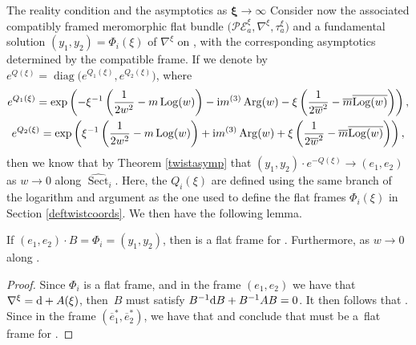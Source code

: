 \begin{subsubsection}{The reality condition and the asymptotics as $\boldsymbol{\xi \to \infty}$}
Consider now the associated compatibly framed meromorphic flat bundle $\bigl(\mathcal{PE}_a^{\xi},\nabla^{\xi},\tau_a^{\xi}\bigr)$ and a fundamental solution $(y_1,y_2)=\Phi_i(\xi)$ of $\nabla^{\xi}$ on , with the corresponding asymptotics determined by the compatible frame. If we denote by $e^{Q(\xi)}=\operatorname{diag}\bigl(e^{Q_1(\xi)},e^{Q_2(\xi)}\bigr)$, where
\begin{gather*}
 e^{Q_1(\xi)}=\exp \left(-\xi^{-1}\left(\frac{1}{2w^2}-m\operatorname{Log}(w)\right)-{\rm i}m^{(3)}\operatorname{Arg}(w)
 -\xi\left(\frac{1}{2\overline{w}^2}-\overline{m}\overline{\operatorname{Log}(w)}\right)\right),\\
 e^{Q_2(\xi)}=\exp \left(\xi^{-1}\left(\frac{1}{2w^2}-m\operatorname{Log}(w)\right)+{\rm i}m^{(3)}\operatorname{Arg}(w)
 +\xi\left(\frac{1}{2\overline{w}^2}-\overline{m}\overline{\operatorname{Log}(w)}\right)\right),
\end{gather*}
then we know that by Theorem \ref{twistasymp} that $(y_1,y_2)\cdot e^{-Q(\xi)} \to (e_1,e_2)$ as $w\to 0$ along $\widehat{\operatorname{Sect}}_i$. Here, the $Q_i(\xi)$ are defined using the same branch of the logarithm and argument as the one used to define the flat frames $\Phi_i(\xi)$ in Section \ref{deftwistcoords}. We then have the following lemma.

\begin{Lemma}\label{dual asympotics}
If $(e_1,e_2)\cdot B=\Phi_i=(y_1,y_2)$, then  is a flat frame for . Furthermore,  as $w\to 0$ along .
\end{Lemma}

\begin{proof}
Since $\Phi_i$ is a flat frame, and in the frame $(e_1,e_2)$ we have that $\nabla^{\xi}={\rm d}+A(\xi)$, then~$B$ must satisfy
$
 B^{-1}{\rm d}B+B^{-1}AB=0$.
It then follows that
.
Since in the frame $(\overline{e}_1^*,\overline{e}_2^*)$, we have that  and conclude that  must be a~flat frame for \smash{$\overline{\nabla^{\xi}}^*$}.


\end{proof}
\end{subsubsection}
